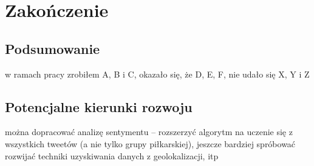 \chapter{Zakończenie}
\section{Podsumowanie}
w ramach pracy zrobiłem A, B i C, okazało się, że D, E, F, nie udało się X, Y i Z
\section{Potencjalne kierunki rozwoju}
można dopracować analizę sentymentu -- rozszerzyć algorytm na 
uczenie się z wszystkich tweetów (a nie tylko grupy piłkarskiej),
jeszcze bardziej spróbować rozwijać techniki uzyskiwania danych
z geolokalizacji, itp